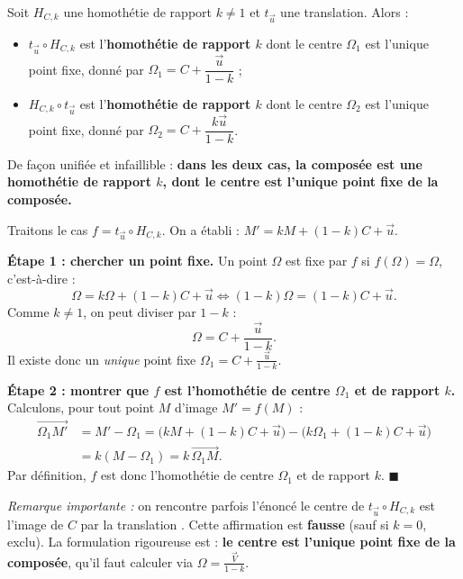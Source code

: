 \documentclass[11pt]{article}
\begin{document}
\begin{propriete}
Soit $H_{C,k}$ une homothétie de rapport $k\neq 1$ et $t_{\vec{u}}$ une translation. Alors :
\begin{itemize}
\item $t_{\vec{u}}\circ H_{C,k}$ est l'\textbf{homothétie de rapport $k$} dont le centre $\Omega_1$ est l'unique point fixe, donné par $\Omega_1 = C + \dfrac{\vec{u}}{1-k}$ ;
\item $H_{C,k}\circ t_{\vec{u}}$ est l'\textbf{homothétie de rapport $k$} dont le centre $\Omega_2$ est l'unique point fixe, donné par $\Omega_2 = C + \dfrac{k\vec{u}}{1-k}$.
\end{itemize}
De façon unifiée et infaillible : \textbf{dans les deux cas, la composée est une homothétie de rapport $k$, dont le centre est l'unique point fixe de la composée.}
\end{propriete}

\begin{experience}
Traitons le cas $f = t_{\vec{u}}\circ H_{C,k}$. On a établi : $M' = kM + (1-k)C + \vec{u}$.

\textbf{Étape 1 : chercher un point fixe.} Un point $\Omega$ est fixe par $f$ si $f(\Omega) = \Omega$, c'est-à-dire :
\[ \Omega = k\Omega + (1-k)C + \vec{u} \iff (1-k)\Omega = (1-k)C + \vec{u}. \]
Comme $k\neq 1$, on peut diviser par $1-k$ :
\[ \Omega = C + \frac{\vec{u}}{1-k}. \]
Il existe donc un \emph{unique} point fixe $\Omega_1 = C + \frac{\vec{u}}{1-k}$.

\textbf{Étape 2 : montrer que $f$ est l'homothétie de centre $\Omega_1$ et de rapport $k$.} Calculons, pour tout point $M$ d'image $M' = f(M)$ :
\begin{align*}
\overrightarrow{\Omega_1 M'} &= M' - \Omega_1 = \bigl(kM + (1-k)C + \vec{u}\bigr) - \bigl(k\Omega_1 + (1-k)C + \vec{u}\bigr) \\
&= k(M - \Omega_1) = k\,\overrightarrow{\Omega_1 M}.
\end{align*}
Par définition, $f$ est donc l'homothétie de centre $\Omega_1$ et de rapport $k$. $\blacksquare$

\textit{Remarque importante :} on rencontre parfois l'énoncé \og le centre de $t_{\vec{u}}\circ H_{C,k}$ est l'image de $C$ par la translation \fg{}. Cette affirmation est \textbf{fausse} (sauf si $k=0$, exclu). La formulation rigoureuse est : \textbf{le centre est l'unique point fixe de la composée}, qu'il faut calculer via $\Omega = \frac{\vec{V}}{1-k}$.
\end{experience}
\end{document}
